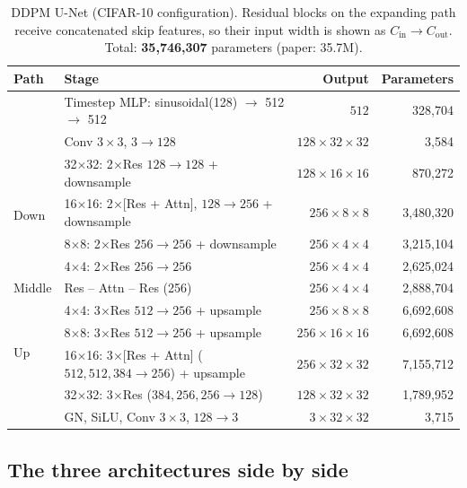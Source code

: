 \begin{table}[t]
\centering\small
\caption{DDPM U-Net (CIFAR-10 configuration). Residual blocks on the expanding path receive concatenated skip
features, so their input width is shown as $C_\text{in}\!\to\!C_\text{out}$. Total: \textbf{35,746,307}
parameters (paper: 35.7M).}
\label{tab:arch-unet}
\begin{tabular}{@{}llrr@{}}
\toprule
Path & Stage & Output & Parameters\\
\midrule
 & Timestep MLP: sinusoidal(128) $\to$ 512 $\to$ 512 & $512$ & 328,704\\
 & Conv $3\times3$, $3\to128$ & $128\times32\times32$ & 3,584\\
\midrule
\multirow{4}{*}{Down}
 & 32$\times$32: 2$\times$Res $128\to128$ + downsample & $128\times16\times16$ & 870,272\\
 & 16$\times$16: 2$\times$[Res + Attn], $128\to256$ + downsample & $256\times8\times8$ & 3,480,320\\
 & 8$\times$8: 2$\times$Res $256\to256$ + downsample & $256\times4\times4$ & 3,215,104\\
 & 4$\times$4: 2$\times$Res $256\to256$ & $256\times4\times4$ & 2,625,024\\
\midrule
Middle & Res -- Attn -- Res (256) & $256\times4\times4$ & 2,888,704\\
\midrule
\multirow{4}{*}{Up}
 & 4$\times$4: 3$\times$Res $512\to256$ + upsample & $256\times8\times8$ & 6,692,608\\
 & 8$\times$8: 3$\times$Res $512\to256$ + upsample & $256\times16\times16$ & 6,692,608\\
 & 16$\times$16: 3$\times$[Res + Attn] ($512,512,384\to256$) + upsample & $256\times32\times32$ & 7,155,712\\
 & 32$\times$32: 3$\times$Res ($384,256,256\to128$) & $128\times32\times32$ & 1,789,952\\
\midrule
 & GN, SiLU, Conv $3\times3$, $128\to3$ & $3\times32\times32$ & 3,715\\
\bottomrule
\end{tabular}
\end{table}

\subsection{The three architectures side by side}
\label{sec:arch-compare}


